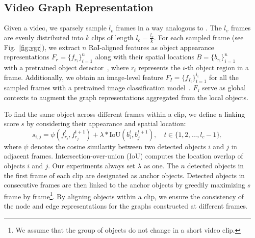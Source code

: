\documentclass[runningheads]{llncs}
\begin{document}
\subsection{Video Graph Representation}
\label{sec:vgr}
Given a video, we sparsely sample $l_v$ frames in a way analogous to \cite{xiao2021video}. The $l_v$ frames are evenly distributed into $k$ clips of length $l_c=\frac{l_v}{k}$.
For each sampled frame (see Fig.~\ref{fig:vgr}), we extract $n$ RoI-aligned features as object appearance representations $F_r\!=\!\{f_{r_i}\}_{i=1}^n$ along with their spatial locations $B\!=\!\{b_{r_i}\}_{i=1}^n$ with a pretrained object detector~\cite{anderson2018bottom,ren2015faster}, where $r_i$ represents the $i$-th object region in a frame. Additionally, we obtain an image-level feature $F_I\!=\!\{f_{I_t}\}_{t=1}^{l_v}$ for all the sampled frames with a pretrained image classification model~\cite{he2016deep}. $F_I$ serve as global contexts to augment the graph representations aggregated from the local objects. 

To find the same object across different frames within a clip, we define a linking score $s$ by considering their appearance and spatial location:
\begin{equation}
    s_{i, j} =  \psi(f_{r_i}^t, f_{r_j}^{t+1}) + \lambda*\text{IoU}(b_i^t, b_j^{t+1}), \quad t\in\{1, 2, \dots, l_c-1\},
\end{equation}
where $\psi$ denotes the cosine similarity between two detected objects $i$ and $j$ in adjacent frames.  Intersection-over-union (IoU) computes the location overlap of objects $i$ and $j$. Our experiments always set  $\lambda$ as one. The $n$ detected objects in the first frame of each clip are designated as anchor objects. Detected objects in consecutive frames are then linked to the anchor objects by greedily maximizing $s$ frame by frame\footnote{We assume that the group of objects do not change in a short video clip.}. By aligning objects within a clip, we ensure the consistency of the node and edge representations for the graphs constructed at different frames.
\end{document}
